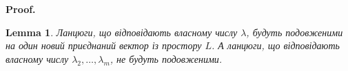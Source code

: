 \documentclass[a4paper, 10pt]{article}
\makeatletter
\theoremstyle{theoremdd}
\newtheorem{lemma}[theorem]{Lemma}
\renewenvironment{proof}[1][Proof.\\]{\par
\pushQED{\hfill \qed}%
\normalfont \topsep6\p@\@plus6\p@\relax
\trivlist
\item\relax
{\bfseries
#1\@addpunct{.}}\hspace\labelsep\ignorespaces
}{%
\popQED\endtrivlist\@endpefalse
}
\makeatother
\begin{document}
\begin{proof}
\iffalse
\begin{lemma}
$\Im B = L_1 \dot{+} L_2 \dot{+} \dots \dot{+} L_m$.
\end{lemma}

\begin{proof}
Покажемо, що $L_j \cap L_i = \{0\}, j \neq i$. Справді,\\
$z \in L_j \cap L_i \Rightarrow z = \left[\begin{gathered} z^0_j f_j + z^1_j h^1_j + \dots + z_j^{k_j} h_j^{k_j} \\ z_i^0f_i + z_i^1 h_i^1 + \dots + z_i^{k_i} h_i^{k_i} \end{gathered} \right.$\\
$\implies z^0_j f_j + z^1_j h^1_j + \dots + z_j^{k_j} h_j^{k_j} + (-z_i^0)f_i + (-z_i^1) h_i^1 + \dots + (-z_i^{k_i}) h_i^{k_i} = 0$\\
За побудовою, $\{L_j, L_i\}$ - елементи з базису $\Im B$, тому є л.н.з.\\
$\implies z^0_j = z^1_j = \dots = z^{k_j}_j = z^0_i = z^1_i = \dots = z^{k_i}_i = 0$\\
Отже, $z = 0$, а тому $L_j \cap L_i = \{0\}$.\\
Таким чином, отримали, що $\Im B = L_1 \dot{+} L_2 \dot{+} \dots \dot{+} L_m$.
\end{proof}
\fi

\begin{lemma}
Ланцюги, що відповідають власному числу $\lambda$, будуть подовженими на один новий приєднаний вектор із простору $L$. А ланцюги, що відповідають власному числу $\lambda_2,\dots,\lambda_m$, не будуть подовженими.
\end{lemma}


\end{proof}
\end{document}
